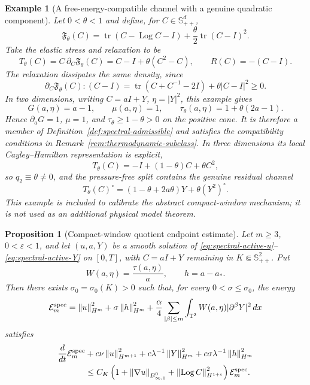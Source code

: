 \documentclass[11pt]{article}
\newtheorem{proposition}{Proposition}[section]
\newtheorem{example}{Example}[section]
\newcommand{\T}{\mathbb T}
\newcommand{\Spp}{\mathbb S_{++}}
\newcommand{\tr}{\operatorname{tr}}
\newcommand{\Log}{\operatorname{Log}}
\newcommand{\calE}{\mathcal E}
\newcommand{\eps}{\varepsilon}
\newcommand{\norm}[1]{\left\lVert #1\right\rVert}
\newcommand{\Besov}{B^0_{\infty,1}}
\begin{document}
\begin{example}[A free-energy-compatible channel with a genuine quadratic component]
\label{ex:quadratic-channel}
Let \(0<\theta<1\) and define, for \(C\in\Spp^d\),
\[
  \mathfrak F_\theta(C)
  =\tr(C-\Log C-I)+\frac{\theta}{2}\tr(C-I)^2 .
\]
Take the elastic stress and relaxation to be
\[
  T_\theta(C)=C\,\partial_C\mathfrak F_\theta(C)
  =C-I+\theta(C^2-C),
  \qquad R(C)=-(C-I).
\]
The relaxation dissipates the same density, since
\[
  \partial_C\mathfrak F_\theta(C):(C-I)
  =\tr(C+C^{-1}-2I)+\theta |C-I|^2\ge0.
\]
In two dimensions, writing \(C=aI+Y\), \(\eta=|Y|^2\), this example gives
\[
  G(a,\eta)=a-1,
  \qquad \mu(a,\eta)=1,
  \qquad \tau_\theta(a,\eta)=1+\theta(2a-1).
\]
Hence \(\partial_aG=1\), \(\mu=1\), and
\(\tau_\theta\ge 1-\theta>0\) on the positive cone.  It is therefore a member of
Definition~\ref{def:spectral-admissible} and satisfies the compatibility
conditions in Remark~\ref{rem:thermodynamic-subclass}.  In three dimensions its
local Cayley--Hamilton representation is explicit,
\[
  T_\theta(C)=-I+(1-\theta)C+\theta C^2,
\]
so \(q_2\equiv\theta\ne0\), and the pressure-free split contains the genuine
residual channel
\[
  T_\theta(C)^\circ=(1-\theta+2a\theta)Y+\theta (Y^2)^\circ .
\]
This example is included to calibrate the abstract compact-window mechanism; it
is not used as an additional physical model theorem.
\end{example}

\begin{proposition}[Compact-window quotient endpoint estimate]
\label{prop:spectral-admissible-endpoint}
Let \(m\ge3\), \(0<\eps<1\), and let \((u,a,Y)\) be a smooth solution of
\eqref{eq:spectral-active-u}--\eqref{eq:spectral-active-Y} on \([0,T]\), with
\(C=aI+Y\) remaining in \(K\Subset\Spp^2\).  Put
\[
  W(a,\eta)=\frac{\tau(a,\eta)}{a},\qquad h=a-a_* .
\]
Then there exists \(\sigma_0=\sigma_0(K)>0\) such that, for every
\(0<\sigma\le\sigma_0\), the energy
\[
  \calE_m^{\rm spec}
  =\norm{u}_{H^m}^2+\sigma\norm{h}_{H^m}^2
  +\frac{\alpha}{4}\sum_{|\beta|\le m}
  \int_{\T^2}W(a,\eta)|\partial^\beta Y|^2\,dx
\]
satisfies
\[
\begin{aligned}
  \frac{d}{dt}\calE_m^{\rm spec}
  &+c\nu\norm{u}_{H^{m+1}}^2
    +c\lambda^{-1}\norm{Y}_{H^m}^2
    +c\sigma\lambda^{-1}\norm{h}_{H^m}^2\\
  &\le C_K\left(1+\norm{\nabla u}_{\Besov}
  +\norm{\Log C}_{H^{1+\eps}}^2\right)\calE_m^{\rm spec}.
\end{aligned}
\label{eq:spectral-admissible-endpoint}
\]
\end{proposition}
\end{document}
